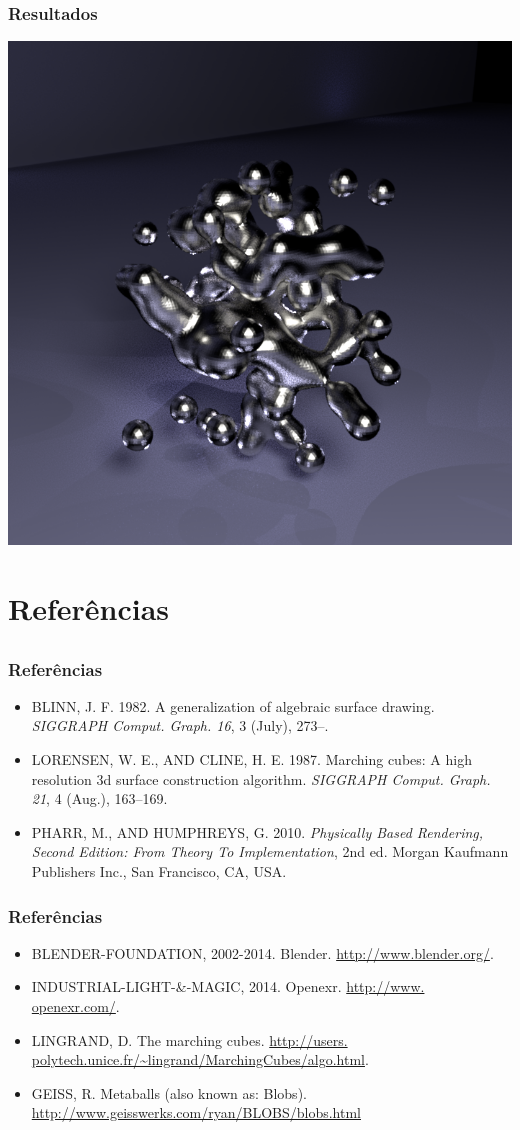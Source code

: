 \documentclass[brazil]{beamer}
\begin{document}
      \begin{frame}
        \frametitle{Resultados}
        \begin{center}
          \includegraphics[width=.6\textwidth]{imgs/metal-blob.png}
        \end{center}
      \end{frame}

\section{Referências}
    \subsection{}
      \begin{frame}
        \frametitle{Referências}
        \begin{itemize}    
          \item BLINN, J. F. 1982. A generalization of algebraic surface drawing. \textit{SIGGRAPH Comput. Graph. 16}, 3 (July), 273–. 
          \item LORENSEN, W. E., AND CLINE, H. E. 1987. Marching cubes: A high resolution 3d surface construction algorithm. \textit{SIGGRAPH Comput. Graph. 21}, 4 (Aug.), 163–169.
          \item PHARR, M., AND HUMPHREYS, G. 2010. \textit{Physically Based Rendering, Second Edition: From Theory To Implementation}, 2nd ed. Morgan Kaufmann Publishers Inc., San Francisco, CA, USA.
        \end{itemize}
      \end{frame}

      \begin{frame}
        \frametitle{Referências}
        \begin{itemize}
          \item BLENDER-FOUNDATION, 2002-2014. Blender. \url{http://www.blender.org/}.
          \item INDUSTRIAL-LIGHT-\&-MAGIC, 2014. Openexr. \url{http://www. openexr.com/}.
          \item LINGRAND, D. The marching cubes. \url{http://users. polytech.unice.fr/~lingrand/MarchingCubes/algo.html}.
          \item GEISS, R. Metaballs (also known as: Blobs). \url{http://www.geisswerks.com/ryan/BLOBS/blobs.html}
        \end{itemize}
      \end{frame}
\end{document}
